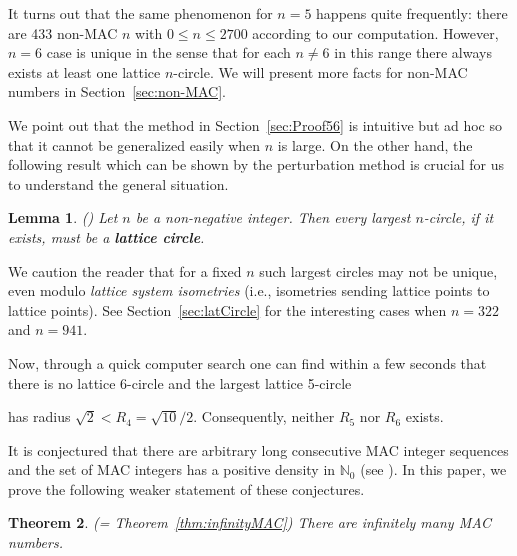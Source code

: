\documentclass{article}
\theoremstyle{theorem}
\newtheorem{theorem}{Theorem}
\newtheorem{lemma}[theorem]{Lemma}
\theoremstyle{definition}
\begin{document}
It turns out that the same phenomenon for $n=5$ happens quite frequently: there are 433 non-MAC $n$ with $0\le n \le 2700$ according to our computation. However, $n=6$ case is unique in the sense that for each $n\ne 6$ in this range there always exists at least one lattice $n$-circle. We will present more facts for non-MAC numbers in Section~\ref{sec:non-MAC}.

We point out that the method in Section~\ref{sec:Proof56} is intuitive but ad hoc so that it cannot be generalized easily when $n$ is large. On the other hand, the following result which can be shown by the perturbation method is crucial for us to understand the general situation.

\begin{lemma}\label{lem:latticeCircle}  \emph{(\cite[Theorem 4]{Zhao2025Aug})}
Let $n$ be a non-negative integer. Then every largest $n$-circle, if it exists, must be a \textbf{lattice circle}.
\end{lemma}
We caution the reader that for a fixed $n$ such largest circles may not be unique, even modulo \emph{lattice system isometries} (i.e., isometries sending lattice points to lattice points). See Section~\ref{sec:latCircle} for the interesting cases when $n=322$ and $n=941$.

Now, through a quick computer search one can find within a few seconds that there is no lattice 6-circle and the largest lattice 5-circle
has radius $\sqrt{2}<R_4=\sqrt{10}/2$.
Consequently, neither $R_5$ nor $R_6$ exists.

It is conjectured that there are arbitrary long consecutive MAC integer sequences and the set of MAC integers has a positive density in ${\mathbb N}_0$ (see \cite[Conjecture 3, (4) and (6)]{Zhao2025Aug}). In this paper, we prove the following weaker statement of these conjectures.

\begin{theorem}\label{thm:1stA} \emph{(= Theorem~\ref{thm:infinityMAC})}
There are infinitely many MAC numbers.
\end{theorem}
\end{document}
